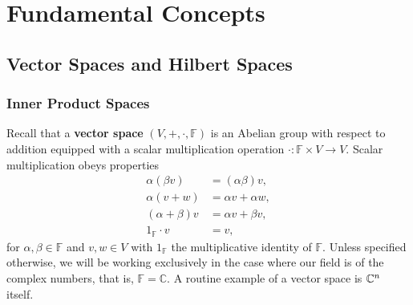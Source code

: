 \section{Fundamental Concepts}
\subsection{Vector Spaces and Hilbert Spaces}
\subsubsection{Inner Product Spaces}
Recall that a \textbf{vector space} $(V, +, \cdot, \mathbb{F})$ is an Abelian group with respect to addition equipped with a scalar multiplication operation $\cdot : \mathbb{F}\times V \to V$. Scalar multiplication obeys properties
\begin{align*}
    \alpha(\beta v) &= (\alpha \beta) v, \\
    \alpha (v+w) &= \alpha v + \alpha w, \\
    (\alpha + \beta)v &= \alpha v + \beta v, \\
    1_\mathbb{F} \cdot v &= v,
\end{align*}
for $\alpha, \beta \in \mathbb{F}$ and $v, w\in V$ with $1_\mathbb{F}$ the multiplicative identity of $\mathbb{F}$. Unless specified otherwise, we will be working exclusively in the case where our field is of the complex numbers, that is, $\mathbb{F} = \mathbb{C}$. A routine example of a vector space is $\mathbb{C}^n$ itself.

